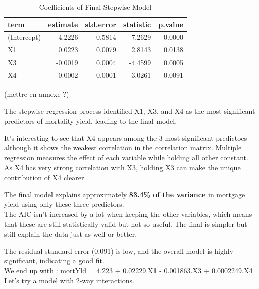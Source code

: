 \documentclass[
  11pt,
]{article}
\begin{document}
\begin{table}[!h]
\centering
\caption{\label{tab:unnamed-chunk-13}Coefficients of Final Stepwise Model}
\centering
\fontsize{8}{10}\selectfont
\begin{tabular}[t]{lrrrr}
\toprule
term & estimate & std.error & statistic & p.value\\
\midrule
(Intercept) & 4.2226 & 0.5814 & 7.2629 & 0.0000\\
X1 & 0.0223 & 0.0079 & 2.8143 & 0.0138\\
X3 & -0.0019 & 0.0004 & -4.4599 & 0.0005\\
X4 & 0.0002 & 0.0001 & 3.0261 & 0.0091\\
\bottomrule
\end{tabular}
\end{table}

(mettre en annexe ?)

The stepwise regression process identified X1, X3, and X4 as the most
significant predictors of mortality yield, leading to the final model.

It's interesting to see that X4 appears among the 3 most significant
predictoes although it shows the weakest correlation in the correlation
matrix. Multiple regression measures the effect of each variable while
holding all other constant. As X4 has very strong correlation with X3,
holding X3 can make the unique contribution of X4 clearer.

The final model explains approximately \textbf{83.4\% of the variance}
in mortgage yield using only these three predictors.\\
The AIC isn't increased by a lot when keeping the other variables, which
means that these are still statistically valid but not so useful. The
final is simpler but still explain the data just as well or better.

The residual standard error (0.091) is low, and the overall model is
highly significant, indicating a good fit.\\
We end up with : mortYld = 4.223 + 0.02229.X1 - 0.001863.X3 +
0.0002249.X4\\

Let's try a model with 2-way interactions.
\end{document}
